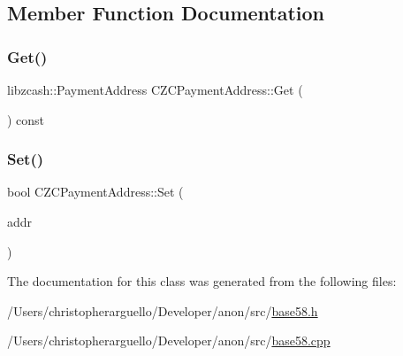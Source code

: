 \subsection{Member Function Documentation}
\mbox{\label{class_c_z_c_payment_address_a95f7c38361637df85674897b473f3e3f}} 
\subsubsection{\texorpdfstring{Get()}{Get()}}
{\footnotesize\ttfamily libzcash\+::\+Payment\+Address C\+Z\+C\+Payment\+Address\+::\+Get (\begin{DoxyParamCaption}{ }\end{DoxyParamCaption}) const}

\mbox{\label{class_c_z_c_payment_address_aa89a4517ba16d1d559d7bd534e8471d0}} 
\subsubsection{\texorpdfstring{Set()}{Set()}}
{\footnotesize\ttfamily bool C\+Z\+C\+Payment\+Address\+::\+Set (\begin{DoxyParamCaption}\item[{const libzcash\+::\+Payment\+Address \&}]{addr }\end{DoxyParamCaption})}



The documentation for this class was generated from the following files\+:\begin{DoxyCompactItemize}
\item 
/\+Users/christopherarguello/\+Developer/anon/src/\mbox{\hyperlink{base58_8h}{base58.\+h}}\item 
/\+Users/christopherarguello/\+Developer/anon/src/\mbox{\hyperlink{base58_8cpp}{base58.\+cpp}}\end{DoxyCompactItemize}

